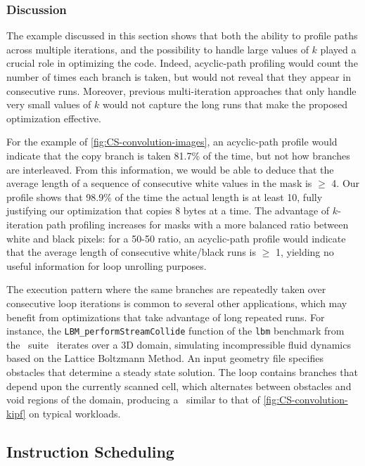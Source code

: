 \subsubsection*{Discussion}
The example discussed in this section shows that both the ability to profile paths across multiple iterations, and the possibility to handle large values of $k$ played a crucial role in optimizing the code. Indeed, acyclic-path profiling would count the number of times each branch is taken, but would not reveal that they appear in consecutive runs. Moreover, previous multi-iteration approaches that only handle very small values of $k$ would not capture the long runs that make the proposed optimization effective. 

For the example of \myfigure\ref{fig:CS-convolution-images}, an acyclic-path profile would indicate that the copy branch is taken 81.7\% of the time, but not how branches are interleaved. From this information, we would be able to deduce that the average length of a sequence of consecutive white values in the mask is $\ge$ 4. Our profile shows that 98.9\% of the time the actual length is at least 10, fully justifying our optimization that copies 8 bytes at a time. The advantage of $k$-iteration path profiling increases for masks with a more balanced ratio between white and black pixels: for a 50-50 ratio, an acyclic-path profile would indicate that the average length of consecutive white/black runs is $\ge$ 1, yielding no useful information for loop unrolling purposes.

The execution pattern where the same branches are repeatedly taken over consecutive loop iterations is common to several other applications, which may benefit from optimizations that take advantage of long repeated runs. For instance, the {\tt LBM\_performStreamCollide} function of the {\tt lbm} benchmark from the \speccpu\ suite~\cite{Henning06}  iterates over a 3D domain, simulating incompressible fluid dynamics based on the Lattice Boltzmann Method. An input geometry file specifies obstacles that determine a steady state solution. The loop contains branches that depend upon the currently scanned cell, which alternates between obstacles and void regions of the domain, producing a \kipf\ similar to that of \myfigure\ref{fig:CS-convolution-kipf} on typical workloads.

\subsection{Instruction Scheduling}
\label{ss:instr-scheduling}

